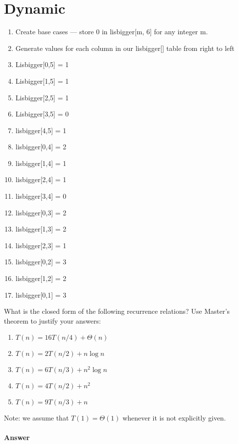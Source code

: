 \documentclass{article}
\begin{document}
\section{Dynamic}

\begin{enumerate}
	\item Create base cases --- store 0 in lisbigger[m, 6] for any integer m. 
	\item Generate values for each column in our lisbigger[] table from right to left
	\item Lisbigger[0,5] = 1
	\item Lisbigger[1,5] = 1
	\item Lisbigger[2,5] = 1
	\item Lisbigger[3,5] = 0
	\item lisbigger[4,5] = 1
	\item lisbigger[0,4] = 2
	\item lisbigger[1,4] = 1
	\item lisbigger[2,4] = 1
	\item lisbigger[3,4] = 0
	\item lisbigger[0,3] = 2
	\item lisbigger[1,3] = 2
	\item lisbigger[2,3] = 1
	\item lisbigger[0,2] = 3
	\item lisbigger[1,2] = 2
	\item lisbigger[0,1] = 3
\end{enumerate}



\nextprob
{}

What is the closed form of the following recurrence relations?  Use Master's
theorem to justify your answers:
\begin{enumerate}
    \item $T(n) = 16 T(n/4) + \Theta(n)$
    \item $T(n) = 2 T(n/2) + n \log{n}$
    \item $T(n) = 6 T(n/3) + n^2 \log{n}$
    \item $T(n) = 4 T(n/2) + n^2$
    \item $T(n) = 9 T(n/3) + n$
\end{enumerate}
Note: we assume that $T(1)=\Theta(1)$ whenever it is not explicitly given.

\paragraph{Answer}
\end{document}
